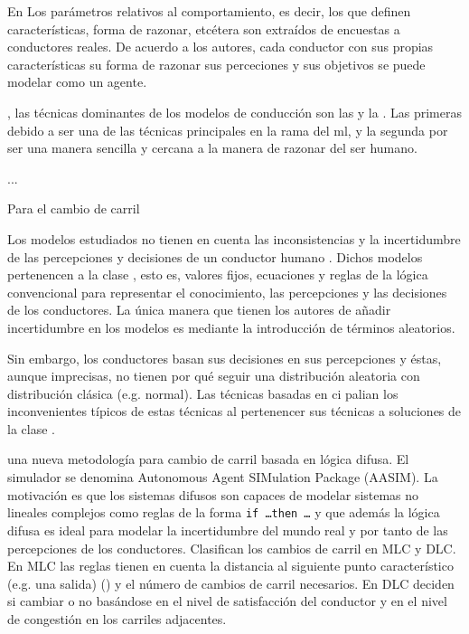 \newthought{}

En \cite{Dia2002} Los parámetros relativos al comportamiento, es decir, los que definen características, forma de razonar, etcétera son extraídos de encuestas a conductores reales. De acuerdo a los autores, cada conductor con sus propias características su forma de razonar sus perceciones y sus objetivos se puede modelar como un agente.

, las técnicas dominantes de los modelos de conducción son las  y la . Las primeras debido a ser una de las técnicas principales en la rama del \gls{ml}, y la segunda por ser una manera sencilla y cercana a la manera de razonar del ser humano.

...

Para el cambio de carril

Los modelos estudiados no tienen en cuenta las inconsistencias y la incertidumbre de las percepciones y decisiones de un conductor humano \cite{McDonald1997}. Dichos modelos pertenencen a la clase , esto es, valores fijos, ecuaciones y reglas de la lógica convencional para representar el conocimiento, las percepciones y las decisiones de los conductores. La única manera que tienen los autores de añadir incertidumbre en los modelos es mediante la introducción de términos aleatorios.

Sin embargo, los conductores basan sus decisiones en sus percepciones y éstas, aunque imprecisas, no tienen por qué seguir una distribución aleatoria con distribución clásica (e.g. normal). Las técnicas basadas en \gls{ci} palian los inconvenientes típicos de estas técnicas al pertenencer sus técnicas a soluciones de la clase .

\cite{Das2009} una nueva metodología para cambio de carril basada en lógica difusa. El simulador se denomina Autonomous Agent SIMulation Package (AASIM). La motivación es que los sistemas difusos son capaces de modelar sistemas no lineales complejos como  reglas de la forma \texttt{if \ldots then \ldots} y que además la lógica difusa es ideal para modelar la incertidumbre del mundo real y por tanto de las percepciones de los conductores. Clasifican los cambios de carril en MLC y DLC. En MLC las reglas tienen en cuenta la distancia al siguiente punto característico (e.g. una salida) () y el número de cambios de carril necesarios. En DLC deciden si cambiar o no basándose en el nivel de satisfacción del conductor y en el nivel de congestión en los carriles adjacentes.

